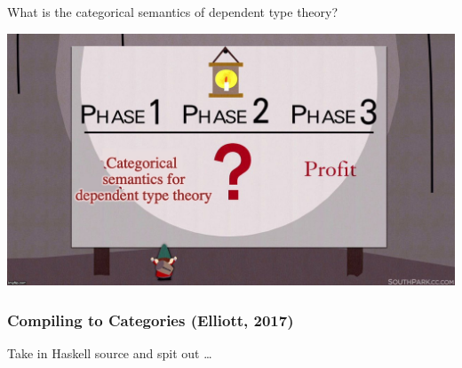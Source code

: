 \documentclass[
xcolor={usenames,dvipsnames,svgnames},
]{beamer}
\begin{document}
  \begin{frame}{}
    \begin{center}
      \Large \color{black}
      What is the categorical semantics of dependent type theory?
    \end{center}
  \end{frame}

  {\usebackgroundtemplate%
  {%
  \parbox[c][\paperheight][c]{\paperwidth}{\centering\includegraphics[width=\paperwidth]{graphics/profit.jpg}}
  }
  \begin{frame}
  \end{frame}
  }

  \begin{frame}
    \frametitle{Compiling to Categories (Elliott, 2017)}
    Take in Haskell source and spit out \ldots
  \end{frame}
\end{document}
